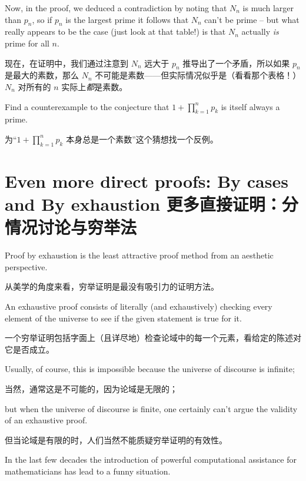 Now, in the proof, we deduced a contradiction by noting that $N_n$ is
much larger than $p_n$, so if $p_n$ is the largest prime it follows that
$N_n$ can't be prime -- but what really appears to be the case (just look 
at that table!) is that $N_n$ actually \emph{is} prime for all $n$. 

现在，在证明中，我们通过注意到 $N_n$ 远大于 $p_n$ 推导出了一个矛盾，所以如果 $p_n$ 是最大的素数，那么 $N_n$ 不可能是素数——但实际情况似乎是（看看那个表格！）$N_n$ 对所有的 $n$ 实际上\emph{都}是素数。

\begin{exer}
Find a counterexample to the conjecture that $1+\prod_{k=1}^n p_k$
is itself always a prime.

为“$1+\prod_{k=1}^n p_k$ 本身总是一个素数”这个猜想找一个反例。
\end{exer}


\clearpage





\newpage


\section[By cases and By exhaustion]{Even more direct proofs: By cases and By exhaustion 更多直接证明：分情况讨论与穷举法}
\label{sec:cases}

Proof by exhaustion is the least attractive proof method from 
an aesthetic perspective.

从美学的角度来看，穷举证明是最没有吸引力的证明方法。

An exhaustive proof consists of literally
(and exhaustively) checking every element of the universe to see
if the given statement is true for it.

一个穷举证明包括字面上（且详尽地）检查论域中的每一个元素，看给定的陈述对它是否成立。

Usually, of course, this is
impossible because the universe of discourse is infinite;

当然，通常这是不可能的，因为论域是无限的；

but when the
universe of discourse is finite, one certainly can't argue the validity
of an exhaustive proof.

但当论域是有限的时，人们当然不能质疑穷举证明的有效性。

In the last few decades the introduction of powerful computational
assistance for mathematicians has lead to a funny situation.

